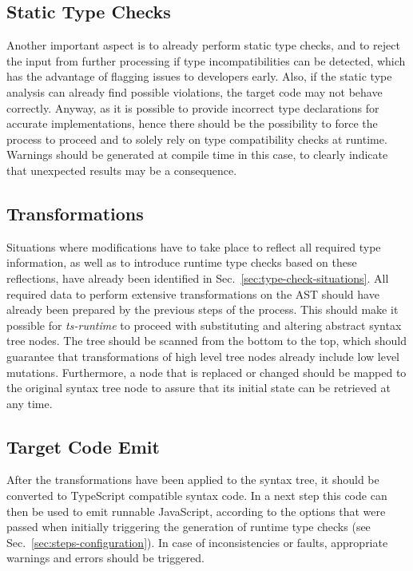 \subsection{Static Type Checks}

Another important aspect is to already perform static type checks, and to reject the input from further processing if type incompatibilities can be detected, which has the advantage of flagging issues to developers early. Also, if the static type analysis can already find possible violations, the target code may not behave correctly. Anyway, as it is possible to provide incorrect type declarations for accurate implementations, hence there should be the possibility to force the process to proceed and to solely rely on type compatibility checks at runtime. Warnings should be generated at compile time in this case, to clearly indicate that unexpected results may be a consequence.

\subsection{Transformations}

Situations where modifications have to take place to reflect all required type information, as well as to introduce runtime type checks based on these reflections, have already been identified in Sec.~\ref{sec:type-check-situations}. All required data to perform extensive transformations on the AST should have already been prepared by the previous steps of the process. This should make it possible for \emph{ts-runtime} to proceed with substituting and altering abstract syntax tree nodes. The tree should be scanned from the bottom to the top, which should guarantee that transformations of high level tree nodes already include low level mutations. Furthermore, a node that is replaced or changed should be mapped to the original syntax tree node to assure that its initial state can be retrieved at any time.

\subsection{Target Code Emit}

After the transformations have been applied to the syntax tree, it should be converted to TypeScript compatible syntax code. In a next step this code can then be used to emit runnable JavaScript, according to the options that were passed when initially triggering the generation of runtime type checks (see Sec.~\ref{sec:steps-configuration}). In case of inconsistencies or faults, appropriate warnings and errors should be triggered.

